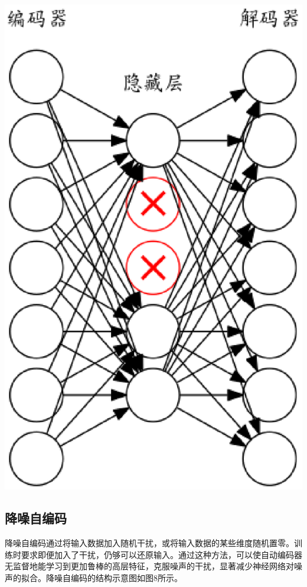 \documentclass{ctacn}%
\begin{document}
\begin{multicols}{2}
\begin{center}
	\includegraphics[scale=0.14, trim=0 0 0 0]{figs/dropout}\\
	\label{fig7}
\end{center}

\subsection{降噪自编码}
降噪自编码通过将输入数据加入随机干扰，或将输入数据的某些维度随机置零。训练时要求即便加入了干扰，仍够可以还原输入。通过这种方法，可以使自动编码器无监督地能学习到更加鲁棒的高层特征，克服噪声的干扰，显著减少神经网络对噪声的拟合。降噪自编码的结构示意图如图8所示。



\end{multicols}
\end{document}
